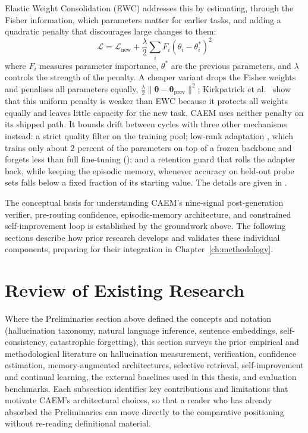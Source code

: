 Elastic Weight Consolidation (EWC) \cite{doi:10.1073/pnas.1611835114} addresses this by estimating, through the Fisher information, which parameters matter for earlier tasks, and adding a quadratic penalty that discourages large changes to them:
\begin{equation}
\mathcal{L} = \mathcal{L}_{\text{new}} + \frac{\lambda}{2} \sum_{i} F_i (\theta_i - \theta_i^*)^2
\end{equation}
where $F_i$ measures parameter importance, $\theta^*$ are the previous parameters, and $\lambda$ controls the strength of the penalty. A cheaper variant drops the Fisher weights and penalises all parameters equally, $\frac{\lambda}{2}\lVert \boldsymbol{\theta} - \boldsymbol{\theta}_{\text{prev}} \rVert^2$; Kirkpatrick et al.~\cite{doi:10.1073/pnas.1611835114} show that this uniform penalty is weaker than EWC because it protects all weights equally and leaves little capacity for the new task. CAEM uses neither penalty on its shipped path. It bounds drift between cycles with three other mechanisms instead: a strict quality filter on the training pool; low-rank adaptation \cite{hu2022lora}, which trains only about $2$ percent of the parameters on top of a frozen backbone and forgets less than full fine-tuning (); and a retention guard that rolls the adapter back, while keeping the episodic memory, whenever accuracy on held-out probe sets falls below a fixed fraction of its starting value. The details are given in .

The conceptual basis for understanding CAEM's nine-signal post-generation verifier, pre-routing confidence, episodic-memory architecture, and constrained self-improvement loop is established by the groundwork above. The following sections describe how prior research develops and validates these individual components, preparing for their integration in Chapter~\ref{ch:methodology}.

\section{Review of Existing Research}

Where the Preliminaries section above defined the concepts and notation (hallucination taxonomy, natural language inference, sentence embeddings, self-consistency, catastrophic forgetting), this section surveys the prior empirical and methodological literature on hallucination measurement, verification, confidence estimation, memory-augmented architectures, selective retrieval, self-improvement and continual learning, the external baselines used in this thesis, and evaluation benchmarks. Each subsection identifies key contributions and limitations that motivate CAEM's architectural choices, so that a reader who has already absorbed the Preliminaries can move directly to the comparative positioning without re-reading definitional material.

